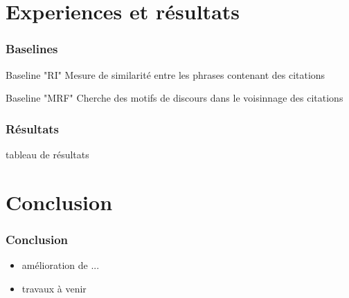 \documentclass[12pt]{beamer}
\begin{document}
\section{Experiences et résultats}
\begin{frame}
  \frametitle{Baselines}
  \begin{block}{Baseline "RI"}
    Mesure de similarité entre les phrases contenant des citations
  \end{block}
  \begin{block}{Baseline "MRF"}
    Cherche des motifs de discours dans le voisinnage des citations 
  \end{block}
\end{frame}

\begin{frame}
  \frametitle{Résultats}
  tableau de résultats
\end{frame}

\section{Conclusion}
\begin{frame}
  \frametitle{Conclusion}

  \begin{itemize}
    \item amélioration de ...
    \item travaux à venir
  \end{itemize}
\end{frame}
\end{document}
